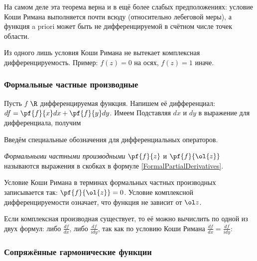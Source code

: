\documentclass[a4paper]{article}
\begin{document}
\begin{note}
На самом деле эта теорема верна и в ещё более слабых предположениях: условие Коши Римана выполняется почти всюду
(относительно лебеговой меры), а функция a priori может быть не дифференцируемой в счётном числе точек области.
\end{note}

\begin{note}
Из одного лишь условия Коши Римана не вытекает комплексная дифференцируемость.
Пример: $f(z)=0$ на осях, $f(z)=1$ иначе.
\end{note}

\subsubsection{Формальные частные производные}

Пусть $f$ $\R$ дифференцируемая функция. Напишем её дифференциал: $df = \pf{f}{x}dx + \pf{f}{y}dy$.
Имеем
Подставляя $dx$ и $dy$ в выражение для дифференциала, получим

Введём специальные обозначения для дифференциальных операторов.

\begin{df}
\emph{Формальными частными производными} $\pf{f}{z}$ и $\pf{f}{\ol{z}}$ называются выражения в
скобках в формуле \eqref{FormalPartialDerivatives}.
\end{df}

Условие Коши Римана в терминах формальных частных производных записывается так: $\pf{f}{\ol{z}} = 0$.
Условие комплексной дифференцируемости означает, что функция не зависит от $\ol z$.

Если комплексная производная существует, то её можно вычислить по одной из двух формул: либо $\frac{df}{dx}$,
либо $\frac{df}{idy}$, так как по условию Коши Римана $\frac{df}{dx} = \frac{df}{idy}$:

\subsubsection{Сопряжённые гармонические функции}
\end{document}

